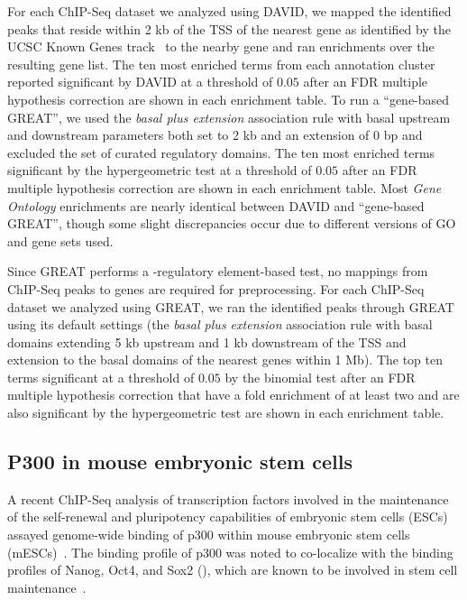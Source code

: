 For each ChIP-Seq dataset we analyzed using DAVID, we mapped the identified peaks that reside
within 2 kb of the TSS of the nearest gene as identified by the UCSC Known Genes
track~\citep{Hsu2006} to the nearby gene and ran enrichments over the resulting gene list.
%
The ten most enriched terms from each annotation cluster reported significant by DAVID at a
threshold of $0.05$ after an FDR multiple hypothesis correction are shown in each enrichment table.
%
To run a ``gene-based GREAT'', we used the \emph{basal plus extension} association rule with
basal upstream and downstream parameters both set to 2 kb and an extension of 0 bp and excluded the set
of curated regulatory domains.
The ten most enriched terms significant by the hypergeometric test at a threshold of $0.05$ after an
FDR multiple hypothesis correction are shown in each enrichment table.
%
Most \emph{Gene Ontology} enrichments are nearly identical between DAVID and ``gene-based GREAT'',
though some slight discrepancies occur due to different versions of GO and gene sets used.
%

%
Since GREAT performs a \cis-regulatory element-based test, no mappings from ChIP-Seq peaks
to genes are required for preprocessing.
%
For each ChIP-Seq dataset we analyzed using GREAT, we ran the identified peaks through GREAT
using its default settings (the \emph{basal plus extension}
association rule with basal domains extending 5 kb upstream and 1 kb downstream of the TSS
and extension to the basal domains of the nearest genes within 1 Mb).
%
The top ten terms significant at a threshold of $0.05$ by the binomial test after an FDR
multiple hypothesis correction that have a fold enrichment
of at least two and are also significant by the hypergeometric test
are shown in each enrichment table.
%

\subsection{P300 in mouse embryonic stem cells}
A recent ChIP-Seq analysis of transcription factors involved in the
maintenance of the self-renewal and pluripotency capabilities of embryonic
stem cells (ESCs) assayed genome-wide binding of p300 within mouse
embryonic stem cells (mESCs)~\citep{Chen2008}.
%
The binding profile of p300 was noted to
co-localize with the binding profiles of Nanog, Oct4, and
Sox2 (\citep{Chen2008}), which are known to be involved in stem cell
maintenance~\citep{Ivanova2006}.

